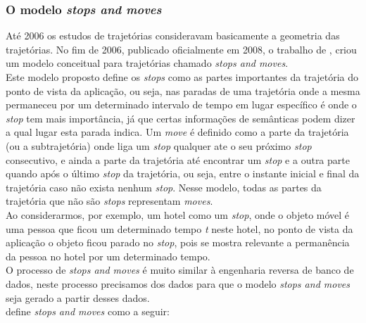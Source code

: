 \documentclass[	12pt, Times, openright, twoside, a4paper, english, brazil]{abntex2}
\begin{document}
\subsubsection{O modelo \textit{stops and moves}}
Até 2006 os estudos de trajetórias consideravam basicamente a geometria das trajetórias. No fim de 2006, publicado oficialmente em 2008, o trabalho de \cite{Spaccapietra2008}, criou um modelo conceitual para trajetórias chamado \textit{stops and moves}.\\
\indent Este modelo proposto define os \textit{stops} como as partes importantes da trajetória do ponto de vista da aplicação, ou seja, nas paradas de uma trajetória onde a mesma permaneceu por um determinado intervalo de tempo em lugar específico é onde o \textit{stop} tem mais importância, já que certas informações de semânticas podem dizer a qual lugar esta parada indica. Um \textit{move} é definido como a parte da trajetória (ou a subtrajetória) onde liga um \textit{stop} qualquer ate o seu próximo \textit{stop} consecutivo, e ainda a parte da trajetória até encontrar um \textit{stop} e a outra parte quando após o último \textit{stop} da trajetória, ou seja, entre o instante inicial e final da trajetória caso não exista nenhum \textit{stop}. Nesse modelo, todas as partes da trajetória que não são \textit{stops} representam \textit{moves}.\\
\indent Ao considerarmos, por exemplo, um hotel como um \textit{stop}, onde o objeto móvel é uma pessoa que ficou um determinado tempo \textit{t} neste hotel, no ponto de vista da aplicação o objeto ficou parado no \textit{stop}, pois se mostra relevante a permanência da pessoa no hotel por um determinado tempo.\\
\indent O processo de \textit{stops and moves} é muito similar à engenharia reversa de banco de dados, neste processo precisamos dos dados para que o modelo \textit{stops and moves} seja gerado a partir desses dados.\\
\indent \cite{Spaccapietra2008} define \textit{stops and moves} como a seguir: 
\end{document}
